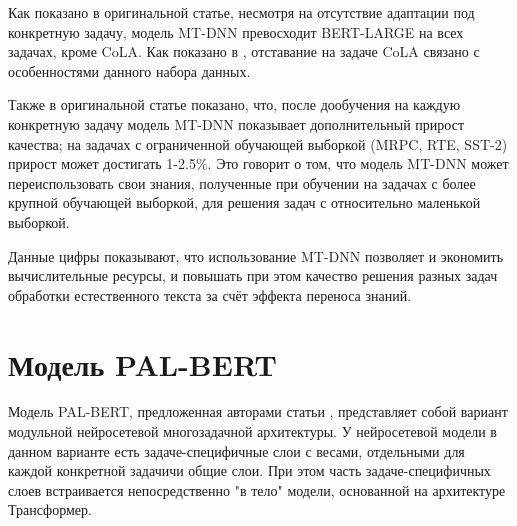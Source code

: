Как показано в оригинальной статье, несмотря на отсутствие адаптации под конкретную задачу, модель MT-DNN превосходит BERT-LARGE на всех задачах, кроме CoLA. Как показано в \cite{na_2022}, отставание на задаче CoLA связано с особенностями данного набора данных. 

Также в оригинальной статье показано, что, после дообучения на каждую конкретную задачу модель MT-DNN показывает дополнительный прирост качества; на задачах с ограниченной обучающей выборкой (MRPC, RTE, SST-2) прирост может достигать 1-2.5\%. Это говорит о том, что модель MT-DNN может переиспользовать свои знания, полученные при обучении на задачах  с более крупной обучающей выборкой, для решения задач с относительно маленькой выборкой.

Данные цифры показывают, что использование MT-DNN позволяет и экономить вычислительные ресурсы, и повышать при этом качество решения разных задач обработки естественного текста за счёт эффекта переноса знаний. 

\section{Модель PAL-BERT} 
Модель PAL-BERT, предложенная авторами статьи \cite{stickland_2019}, представляет собой вариант модульной нейросетевой многозадачной архитектуры. У нейросетевой модели в данном варианте есть задаче-специфичные слои с весами, отдельными для каждой конкретной задачичи общие слои. При этом часть задаче-специфичных слоев встраивается непосредственно "в тело" модели, основанной на архитектуре Трансформер. 

